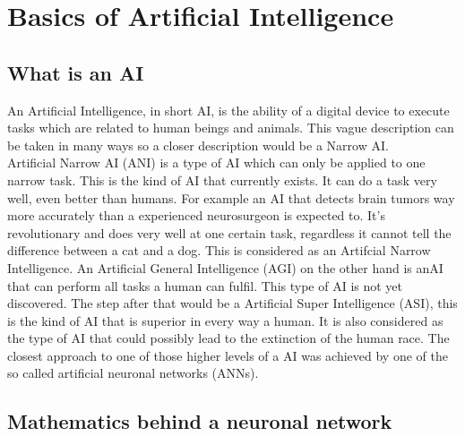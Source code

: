 \documentclass[12pt]{article}
\begin{document}
\section{Basics of Artificial Intelligence}
\subsection{What is an AI}
An \gls{Artificial Intelligence}, in short \gls{AI}, is the ability of a digital device to execute tasks which are related to human beings and animals. This vague description can be taken in many ways so a closer description would be a \gls{Narrow AI}. \cite{aibritannica}\\
Artificial \gls{Narrow AI} (ANI) is a type of \gls{AI} which can only be applied to one narrow task. This is the kind of \gls{AI} that currently exists. It can do a task very well, even better than humans. For example an \gls{AI} that detects brain tumors way more accurately than a experienced neurosurgeon is expected to. It's revolutionary and does very well at one certain task, regardless it cannot tell the difference between a cat and a dog. This is considered as an Artifcial Narrow Intelligence. An Artificial General Intelligence (AGI) on the other hand is an\gls{AI} that can perform all tasks a human can fulfil. This type of \gls{AI} is not yet discovered. The step after that would be a Artificial Super Intelligence (ASI), this is the kind of \gls{AI} that is superior in every way a human. It is also considered as the type of \gls{AI} that could possibly lead to the extinction of the human race. The closest approach to one of those higher levels of a \gls{AI} was achieved by one of the so called artificial \glspl{neuronal network} (\glspl{ANN}).
\cite{narrowAI}
\subsection{Mathematics behind a neuronal network}
\end{document}
